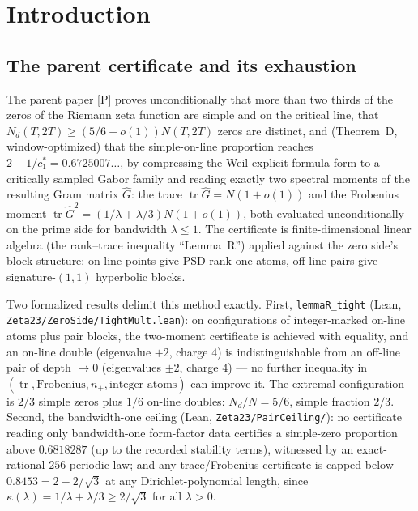\documentclass[11pt]{article}
\theoremstyle{plain}
\theoremstyle{definition}
\theoremstyle{remark}
\newcommand{\Gh}{\widehat{G}}
\newcommand{\tr}{\operatorname{tr}}
\newcommand{\Nd}{N_{d}}
\begin{document}
\section{Introduction}
\label{sec:intro}

\subsection{The parent certificate and its exhaustion}

The parent paper [P] proves unconditionally that more than two thirds of the
zeros of the Riemann zeta function are simple and on the critical line, that
$\Nd(T, 2T) \ge (5/6 - o(1)) N(T, 2T)$ zeros are distinct, and (Theorem~D,
window-optimized) that the simple-on-line proportion reaches
$2 - 1/c_1^{*} = 0.6725007\ldots$, by compressing the Weil explicit-formula form
to a critically sampled Gabor family and reading exactly two spectral moments of
the resulting Gram matrix $\Gh$: the trace $\tr \Gh = N(1 + o(1))$ and the
Frobenius moment $\tr \Gh^2 = (1/\lambda + \lambda/3) N (1 + o(1))$, both
evaluated unconditionally on the prime side for bandwidth $\lambda \le 1$. The
certificate is finite-dimensional linear algebra (the rank--trace inequality
``Lemma~R'') applied against the zero side's block structure: on-line points give
PSD rank-one atoms, off-line pairs give signature-$(1,1)$ hyperbolic blocks.

Two formalized results delimit this method exactly. First,
\texttt{lemmaR\_tight} (Lean, \texttt{Zeta23/}\allowbreak\texttt{ZeroSide/}\allowbreak\texttt{TightMult.lean}): on
configurations of integer-marked on-line atoms plus pair blocks, the two-moment
certificate is achieved with equality, and an on-line double (eigenvalue $+2$,
charge $4$) is indistinguishable from an off-line pair of depth $\to 0$
(eigenvalues $\pm 2$, charge $4$) --- no further inequality in
$(\tr, \text{Frobenius}, n_+, \text{integer atoms})$ can improve it. The
extremal configuration is $2/3$ simple zeros plus $1/6$ on-line doubles:
$\Nd/N = 5/6$, simple fraction $2/3$. Second, the bandwidth-one ceiling (Lean,
\texttt{Zeta23/PairCeiling/}): no certificate reading only bandwidth-one
form-factor data certifies a simple-zero proportion above $0.6818287$ (up to the
recorded stability terms), witnessed by an exact-rational $256$-periodic law; and
any trace/Frobenius certificate is capped below $0.8453 = 2 - 2/\sqrt{3}$ at any
Dirichlet-polynomial length, since $\kappa(\lambda) = 1/\lambda + \lambda/3 \ge
2/\sqrt{3}$ for all $\lambda > 0$.
\end{document}
